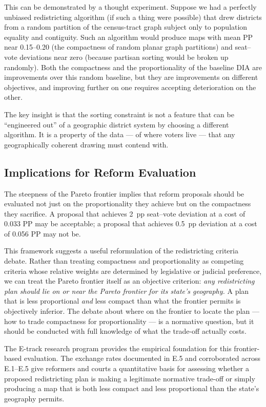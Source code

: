 This can be demonstrated by a thought experiment.  Suppose we had a perfectly
unbiased redistricting algorithm (if such a thing were possible) that drew
districts from a random partition of the census-tract graph subject only to
population equality and contiguity.  Such an algorithm would produce maps with
mean PP near 0.15--0.20 (the compactness of random planar graph partitions)
and seat--vote deviations near zero (because partisan sorting would be broken
up randomly).  Both the compactness and the proportionality of the baseline
DIA are improvements over this random baseline, but they are improvements on
different objectives, and improving further on one requires accepting deterioration
on the other.

The key insight is that the sorting constraint is not a feature that can be
``engineered out'' of a geographic district system by choosing a different
algorithm.  It is a property of the data --- of where voters live --- that
any geographically coherent drawing must contend with.

\subsection{Implications for Reform Evaluation}

The steepness of the Pareto frontier implies that reform proposals should be
evaluated not just on the proportionality they achieve but on the compactness
they sacrifice.  A proposal that achieves 2~pp seat--vote deviation at a cost
of 0.033 PP may be acceptable; a proposal that achieves 0.5~pp deviation at
a cost of 0.056 PP may not be.

This framework suggests a useful reformulation of the redistricting criteria
debate.  Rather than treating compactness and proportionality as competing
criteria whose relative weights are determined by legislative or judicial
preference, we can treat the Pareto frontier itself as an objective criterion:
\emph{any redistricting plan should lie on or near the Pareto frontier for its
state's geography.}  A plan that is less proportional \emph{and} less compact
than what the frontier permits is objectively inferior.  The debate about where
on the frontier to locate the plan --- how to trade compactness for
proportionality --- is a normative question, but it should be conducted with
full knowledge of what the trade-off actually costs.

The E-track research program provides the empirical foundation for this
frontier-based evaluation.  The exchange rates documented in E.5 and
corroborated across E.1--E.5 give reformers and courts a quantitative basis
for assessing whether a proposed redistricting plan is making a legitimate
normative trade-off or simply producing a map that is both less compact and
less proportional than the state's geography permits.

